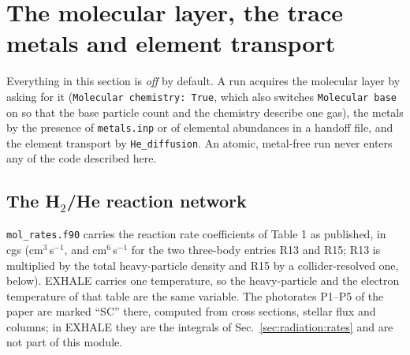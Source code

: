 \section{The molecular layer, the trace metals and element transport}
\label{sec:mol}

Everything in this section is \emph{off} by default. A run acquires the
molecular layer by asking for it (\texttt{Molecular chemistry: True}, which
also switches \texttt{Molecular base} on so that the base particle count and
the chemistry describe one gas), the metals by the presence of \texttt{metals.inp} or of elemental
abundances in a handoff file, and the element transport by
\texttt{He\_diffusion}. An atomic, metal-free run never enters any of the
code described here.

\subsection{\texorpdfstring{The H$_2$/He reaction network}{The H2/He reaction network}}
\label{sec:mol:network}

\texttt{mol\_rates.f90} carries the reaction rate coefficients of
\citet{Koskinen2022} Table 1 as published, in cgs
(cm$^{3}$\,s$^{-1}$, and cm$^{6}$\,s$^{-1}$ for the two three-body entries
R13 and R15; R13 is multiplied by the total heavy-particle density and R15 by
a collider-resolved one, below).
EXHALE carries one temperature, so the heavy-particle and the electron
temperature of that table are the same variable. The photorates P1--P5 of
the paper are marked ``SC'' there, computed from cross sections, stellar
flux and columns; in EXHALE they are the integrals of
Sec.~\ref{sec:radiation:rates} and are not part of this module.

